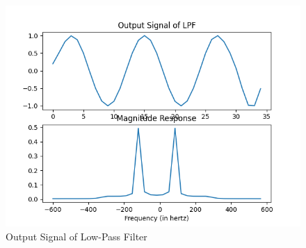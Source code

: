 \documentclass{article}
\begin{document}
\begin{figure}[ht]
  \centering
  \includegraphics[scale=0.5]{./dsp/figs/d_l_out.png}
  \caption{Output Signal of Low-Pass Filter}
  \label{fig:d_l_out}
\end{figure}
\end{document}
